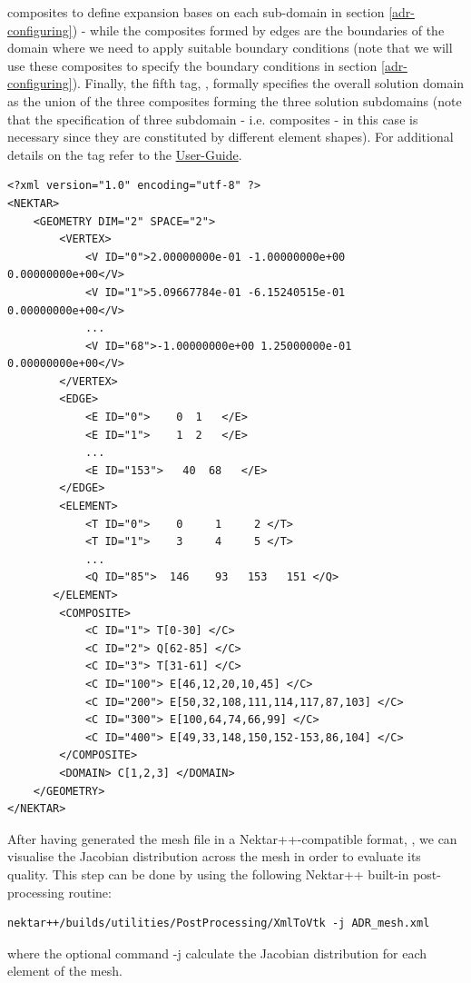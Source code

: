 composites to define expansion bases on each sub-domain in section \ref{adr-configuring}) 
- while the composites formed by edges are the boundaries of the domain where we need 
to apply suitable boundary conditions (note that we will use these composites to specify 
the boundary conditions in section \ref{adr-configuring}). 
Finally, the fifth tag, , formally specifies the overall solution domain as the 
union of the three composites forming the three solution subdomains (note that the specification 
of three subdomain - i.e. composites - in this case is necessary since they are constituted 
by different element shapes). For additional details on the  tag refer 
to the \href{http://www.nektar.info/downloads/8}{User-Guide}.
%
\begin{lstlisting}[style=XMLStyle]
<?xml version="1.0" encoding="utf-8" ?>
<NEKTAR>
    <GEOMETRY DIM="2" SPACE="2">
        <VERTEX>
            <V ID="0">2.00000000e-01 -1.00000000e+00 0.00000000e+00</V>
            <V ID="1">5.09667784e-01 -6.15240515e-01 0.00000000e+00</V>
            ...
            <V ID="68">-1.00000000e+00 1.25000000e-01 0.00000000e+00</V>
        </VERTEX>
        <EDGE>
            <E ID="0">    0  1   </E>
            <E ID="1">    1  2   </E>
            ...
            <E ID="153">   40  68   </E>
        </EDGE>
        <ELEMENT>
            <T ID="0">    0     1     2 </T>
            <T ID="1">    3     4     5 </T>
            ...
            <Q ID="85">  146    93   153   151 </Q>
       </ELEMENT>
        <COMPOSITE>
            <C ID="1"> T[0-30] </C>
            <C ID="2"> Q[62-85] </C>
            <C ID="3"> T[31-61] </C>
            <C ID="100"> E[46,12,20,10,45] </C>
            <C ID="200"> E[50,32,108,111,114,117,87,103] </C>
            <C ID="300"> E[100,64,74,66,99] </C>
            <C ID="400"> E[49,33,148,150,152-153,86,104] </C>
        </COMPOSITE>
        <DOMAIN> C[1,2,3] </DOMAIN>
    </GEOMETRY>
</NEKTAR>
\end{lstlisting}      
%
After having generated the mesh file in a Nektar++-compatible format, , 
we can visualise the Jacobian distribution across the mesh in order to evaluate its quality. 
This step can be done by using the following Nektar++ built-in post-processing routine:
%
\begin{lstlisting}[style=BashInputStyle]
nektar++/builds/utilities/PostProcessing/XmlToVtk -j ADR_mesh.xml 
\end{lstlisting}
%
where the optional command -j calculate the Jacobian distribution for each element of the mesh.
